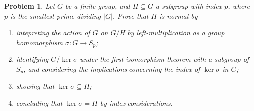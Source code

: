 \documentclass[11pt, letterpaper]{article}
\theoremstyle{plain}
\newtheorem{problem}{Problem}[section]
\begin{document}
\begin{problem}
	Let $G$ be a finite group, and $H\subseteq G$ a subgroup with index $p$, where $p$ is the smallest prime dividing $\left| G \right| $. Prove that $H$ is normal by
	\begin{enumerate}
		\item intepreting the action of $G$ on $G/H$  by left-multiplication as a group homomorphism $\sigma :G\to S_p$;
		\item identifying $G/\ker \sigma $ under the first isomorphism theorem with a subgroup of $S_p$, and considering the implications concerning the index of $\ker \sigma $ in $G$;
		\item showing that $\ker \sigma \subseteq H$;
		\item concluding that $\ker \sigma =H$ by index considerations.
	\end{enumerate}
\end{problem}
\end{document}
